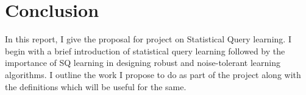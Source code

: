 \section{Conclusion}
In this report, I give the proposal for project on Statistical Query learning. I begin with a brief introduction of statistical query learning followed by the importance of SQ learning in designing robust and noise-tolerant learning algorithms. I outline the work I propose to do as part of the project along with the definitions which will be useful for the same.
